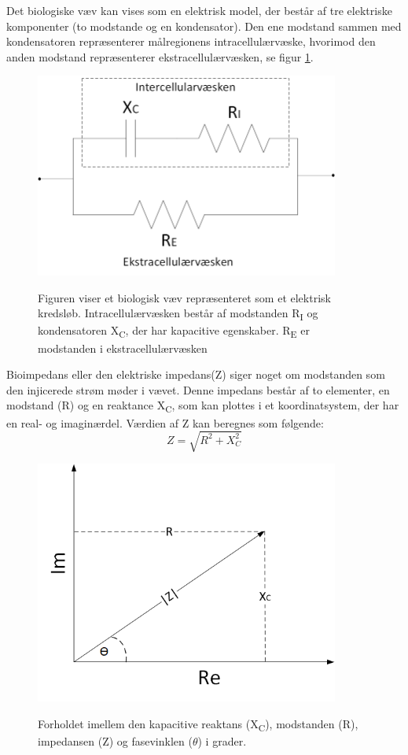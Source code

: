 Det biologiske væv kan vises som en elektrisk model, der består af tre elektriske komponenter (to modstande og en kondensator). Den ene modstand sammen med kondensatoren repræsenterer målregionens intracellulærvæske, hvorimod den anden modstand repræsenterer ekstracellulærvæsken, se figur \ref{fig:vaevsmodel}.

\begin{figure}[H]
\centering
{\includegraphics[width=10cm]
{Figure/vaevsmodel}}
\caption{Figuren viser et biologisk væv repræsenteret som et elektrisk kredsløb. Intracellulærvæsken består af modstanden  R\textsubscript{I} og kondensatoren X\textsubscript{C}, der har kapacitive egenskaber. R\textsubscript{E} er modstanden i ekstracellulærvæsken}
\label{fig:vaevsmodel}
\end{figure}

\pagebreak


Bioimpedans eller den elektriske impedans(Z) siger noget om modstanden som den injicerede strøm møder i vævet. Denne impedans består af to elementer, en modstand (R) og en reaktance X\textsubscript{C}, som kan plottes i et koordinatsystem, der har en real- og imaginærdel. Værdien af Z kan beregnes som følgende: 
\begin{equation}
Z=\sqrt{R^{2}+X^{2}_{C}}
\end{equation} 

\begin{figure}[H]
\centering
{\includegraphics[width=10cm]
{Figure/vektor}}
\caption{Forholdet imellem den kapacitive reaktans (X\textsubscript{C}), modstanden (R), impedansen (Z) og fasevinklen ($\theta$) i grader.}
\label{fig:vektor}
\end{figure}


